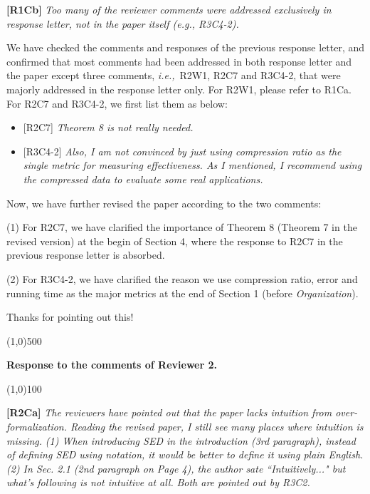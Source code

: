 \documentclass{letter}
\newcommand{\ie}{\emph{i.e.,}\xspace}
\begin{document}
\textbf{[R1Cb]} \emph{Too many of the reviewer comments were addressed exclusively in response letter, not in the paper itself (e.g., {R3C4-2}).}

We have checked the comments and responses of the previous response letter, and confirmed that most comments had been addressed in both response letter and the paper except three comments, \ie~{R2W1}, {R2C7} and {R3C4-2}, that were majorly addressed in the response letter only. For R2W1, please refer to R1Ca. For R2C7 and R3C4-2, we first list them as below:
\begin{itemize}

  \item {{[R2C7]} \emph{Theorem 8 is not really needed.}}

  \item {{[R3C4-2]} \emph{Also, I am not convinced by just using compression ratio as the single metric for measuring effectiveness. As I mentioned, I recommend using the compressed data to evaluate some real applications.}
}
\end{itemize}

Now, we have further revised the paper according to the two comments:

(1) For {R2C7}, we have clarified the importance of Theorem 8 (Theorem 7 in the revised version) at the begin of Section 4, where the response to R2C7 in the previous response letter is absorbed.

(2) For {R3C4-2}, we have clarified the reason we use compression ratio, error and running time as the major metrics at the end of Section 1 (before \emph{Organization}).

Thanks for pointing out this!





\line(1,0){500}

\textbf{Response to the comments of Reviewer 2.}

\line(1,0){100}


\textbf{[R2Ca]} \emph{The reviewers have pointed out that the paper lacks intuition from over-formalization. Reading the revised paper, I still see many places where intuition is missing.}
\emph{(1) When introducing SED in the introduction (3rd paragraph), instead of defining SED using notation, it would be better to define it using plain English.}
\emph{(2) In Sec. 2.1 (2nd paragraph on Page 4), the author sate ``Intuitively..." but what's following is not intuitive at all.}
\emph{Both are pointed out by {R3C2}.}
\end{document}
